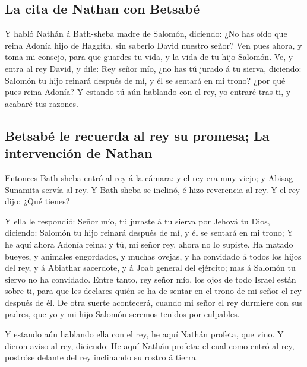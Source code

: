 \hypertarget{la-cita-de-nathan-con-betsabuxe9}{%
\subsection{La cita de Nathan con
Betsabé}\label{la-cita-de-nathan-con-betsabuxe9}}

 Y habló Nathán á Bath-sheba madre de Salomón, diciendo:
¿No has oído que reina Adonía hijo de Haggith, sin saberlo David nuestro
señor?  Ven pues ahora, y toma mi consejo, para que
guardes tu vida, y la vida de tu hijo Salomón.  Ve, y
entra al rey David, y dile: Rey señor mío, ¿no has tú jurado á tu
sierva, diciendo: Salomón tu hijo reinará después de mí, y él se sentará
en mi trono? ¿por qué pues reina Adonía?  Y estando tú
aún hablando con el rey, yo entraré tras ti, y acabaré tus razones.

\hypertarget{betsabuxe9-le-recuerda-al-rey-su-promesa-la-intervenciuxf3n-de-nathan}{%
\subsection{Betsabé le recuerda al rey su promesa; La intervención de
Nathan}\label{betsabuxe9-le-recuerda-al-rey-su-promesa-la-intervenciuxf3n-de-nathan}}

 Entonces Bath-sheba entró al rey á la cámara: y el rey
era muy viejo; y Abisag Sunamita servía al rey.  Y
Bath-sheba se inclinó, é hizo reverencia al rey. Y el rey dijo: ¿Qué
tienes?

 Y ella le respondió: Señor mío, tú juraste á tu sierva
por Jehová tu Dios, diciendo: Salomón tu hijo reinará después de mí, y
él se sentará en mi trono;  Y he aquí ahora Adonía reina:
y tú, mi señor rey, ahora no lo supiste.  Ha matado
bueyes, y animales engordados, y muchas ovejas, y ha convidado á todos
los hijos del rey, y á Abiathar sacerdote, y á Joab general del
ejército; mas á Salomón tu siervo no ha convidado.  Entre
tanto, rey señor mío, los ojos de todo Israel están sobre ti, para que
les declares quién se ha de sentar en el trono de mi señor el rey
después de él.  De otra suerte acontecerá, cuando mi
señor el rey durmiere con sus padres, que yo y mi hijo Salomón seremos
tenidos por culpables.

 Y estando aún hablando ella con el rey, he aquí Nathán
profeta, que vino.  Y dieron aviso al rey, diciendo: He
aquí Nathán profeta: el cual como entró al rey, postróse delante del rey
inclinando su rostro á tierra.

